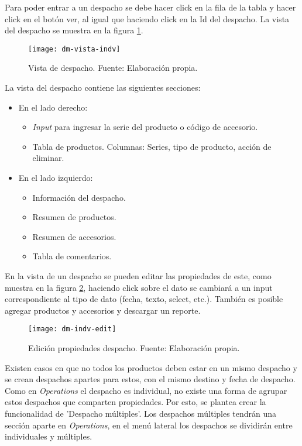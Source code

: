 Para poder entrar a un despacho se debe hacer click en la fila de la tabla y hacer click en el botón ver, al igual que haciendo click en la Id del despacho.
La vista del despacho se muestra en la figura \ref{fig:dm-vista-indv}.

\begin{figure}[H]
	\centering
	\texttt{[image: dm-vista-indv]}
	\caption{\label{fig:dm-vista-indv} Vista de despacho. Fuente: Elaboración propia.}
\end{figure}

La vista del despacho contiene las siguientes secciones:
\begin{itemize}
    \item En el lado derecho:
    \begin{itemize}
        \item \textit{Input} para ingresar la serie del producto o código de accesorio.
        \item Tabla de productos. Columnas: Series, tipo de producto, acción de eliminar.
    \end{itemize}
    \item En el lado izquierdo:
    \begin{itemize}
        \item Información del despacho.
        \item Resumen de productos.
        \item Resumen de accesorios.
        \item Tabla de comentarios.
    \end{itemize}
\end{itemize}

En la vista de un despacho se pueden editar las propiedades de este, como muestra en la figura \ref{fig:dm-indv-edit}, haciendo click sobre el dato se cambiará a un input correspondiente al tipo de dato (fecha, texto, select, etc.). También es posible agregar productos y accesorios y descargar un reporte.

\begin{figure}[H]
	\centering
	\texttt{[image: dm-indv-edit]}
	\caption{\label{fig:dm-indv-edit} Edición propiedades despacho. Fuente: Elaboración propia.}
\end{figure}
Existen casos en que no todos los productos deben estar en un mismo despacho y se crean despachos apartes para estos, con el mismo destino y fecha de despacho.
Como en \textit{Operations} el despacho es individual, no existe una forma de agrupar estos despachos que comparten propiedades. Por esto, se plantea crear la funcionalidad de 'Despacho múltiples'. 
Los despachos múltiples tendrán una sección aparte en \textit{Operations}, en el menú lateral los despachos se dividirán entre individuales y múltiples.

